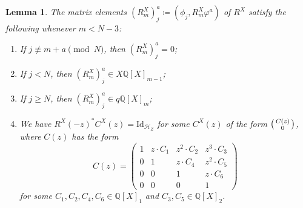 \documentclass[10pt]{amsart}
\newtheorem{lem}[thm]{Lemma}
\theoremstyle{definition}
\theoremstyle{remark}
\theoremstyle{plain}
\theoremstyle{definition}
\theoremstyle{remark}
\newcommand{\Q}{\mathbb{Q}}
\newcommand{\msc}[1]{\mathscr{#1}}
\newcommand{\mr}[1]{\mathrm{#1}}
\newcommand{\1}{\mathbf{1}}
\newcommand{\2}{\mathbf{2}}
\newcommand{\3}{\mathbf{3}}
\numberwithin{equation}{section}
\begin{document}
\begin{lem}\label{lem:matrixelementsRX}
    The matrix elements $(R^X_m)_j^a \coloneqq (\phi_j, R_m^X \varphi^a)$ of $R^{X}$ satisfy the following whenever $m < N-3$:
    \begin{enumerate}
        \item If $j \not\equiv m+a \pmod{N}$, then $(R^X_m)_j^a = 0$;
        \item If $j < N$, then $(R^X_m)_j^a \in X \Q[X]_{m-1}$;
        \item If $j \geq N$, then $(R^X_m)_j^a \in q \Q[X]_m$;
        \item We have $R^X(-z)^* C^X(z) = \mr{Id}_{\msc{H}_Z}$ for some $C^X(z)$ of the form $\begin{psmallmatrix}
            C(z) \\ 0
        \end{psmallmatrix}$, where $C(z)$ has the form
            \[ C(z) =  \begin{pmatrix}
                1 & z \cdot C_{1} & z^2 \cdot C_{2} & z^3 \cdot C_{3}\\
                0 & 1 & z \cdot C_{4} & z^2 \cdot C_{5} \\
                0 & 0 & 1 & z \cdot C_6 \\
                0 & 0 & 0 & 1
            \end{pmatrix}
            \]
            for some $C_1, C_2, C_4, C_6 \in \Q[X]_1$ and $C_3, C_5 \in \Q[X]_2$.
    \end{enumerate}
\end{lem}
\end{document}
